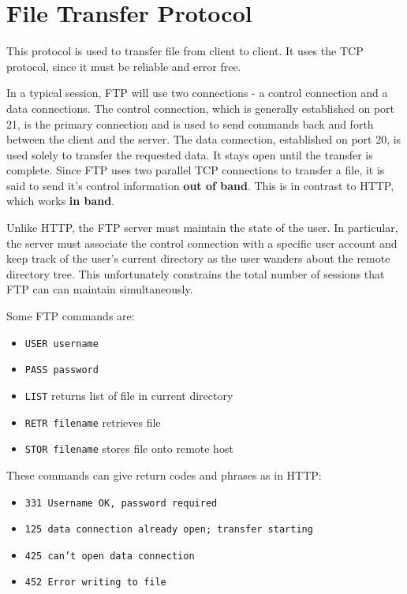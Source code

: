 \documentclass[12pt,letterpaper]{amsbook}
\theoremstyle{definition}
\begin{document}
\section{File Transfer Protocol}

This protocol is used to transfer file from client to client. It uses the TCP protocol, since it must be reliable and error free.

In a typical session, FTP will use two connections - a control connection and a data connections. The control connection, which is generally established on port 21, is the primary connection and is used to send commands back and forth between the client and the server. The data connection, established on port 20, is used solely to transfer the requested data. It stays open until the transfer is complete. Since FTP uses two parallel TCP connections to transfer a file, it is said to send it's control information \textbf{out of band}. This is in contrast to HTTP, which works \textbf{in band}. 

Unlike HTTP, the FTP server must maintain the state of the user. In particular, the server must associate the control connection with a specific user account and keep track of the user's current directory as the user wanders about the remote directory tree. This unfortunately constrains the total number of sessions that FTP can can maintain simultaneously.

Some FTP commands are:

\begin{itemize}
  \item \texttt{USER username} 
  \item \texttt{PASS password} 
  \item \texttt{LIST} returns list of file in current directory
  \item \texttt{RETR filename} retrieves file
  \item \texttt{STOR filename} stores file onto remote host
\end{itemize}

These commands can give return codes and phrases as in HTTP:

\begin{itemize}
  \item \texttt{331 Username OK, password required}
  \item \texttt{125 data connection already open; transfer starting}
  \item \texttt{425 can't open data connection}
  \item \texttt{452 Error writing to file}
\end{itemize}
\end{document}
